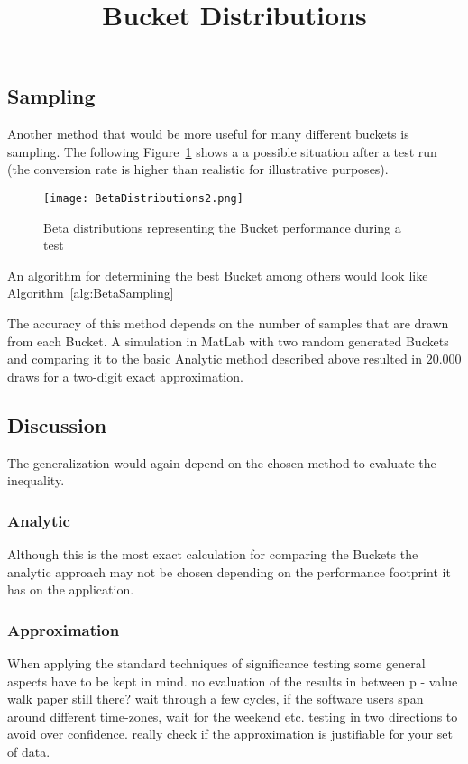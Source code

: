 \documentclass[../Thesis.tex]{subfiles}
\begin{document}
\subsection{Sampling}
Another method that would be more useful for many different buckets is sampling. The following Figure~\ref{fig:SampleBucks} shows a a possible situation after a test run (the conversion rate is higher than realistic for illustrative purposes).
\begin{figure}[h]
\centering
\texttt{[image: BetaDistributions2.png]}
\title{Bucket Distributions}
\caption[Bucket Distributions]{Beta distributions representing the Bucket performance during a test}
\label{fig:SampleBucks}
\end{figure}
An algorithm for determining the best Bucket among others would look like Algorithm~\ref{alg:BetaSampling} 
The accuracy of this method depends on the number of samples that are drawn from each Bucket. A simulation in MatLab with two random generated Buckets and comparing it to the basic Analytic method described above resulted in $20.000$ draws for a two-digit exact approximation.


\subsection{Discussion}
The generalization would again depend on the chosen method to evaluate the inequality.
\subsubsection{Analytic}
Although this is the most exact calculation for comparing the Buckets the analytic approach may not be chosen depending on the performance footprint it has on the application.


\subsubsection{Approximation}
When applying the standard techniques of significance testing some general aspects have to be kept in mind.
no evaluation of the results in between p - value walk paper still there?
wait through a few cycles, if the software users span around different time-zones, wait for the weekend etc.
testing in two directions to avoid over confidence. really check if the approximation is justifiable for your set of data.
\end{document}
